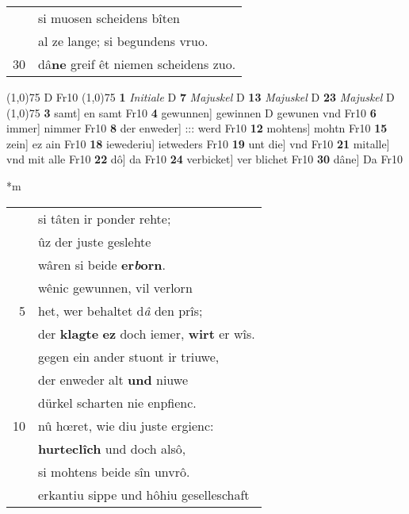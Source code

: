 \documentclass[8pt,a4paper,notitlepage]{article}
\begin{document}
\begin{table}[ht]
\begin{minipage}[t]{0.5\linewidth}
\begin{tabular}{rl}
 & si muosen scheidens bîten\\ 
 & al ze lange; si begundens vruo.\\ 
30 & dâ\textbf{ne} greif êt niemen scheidens zuo.\\ 
\end{tabular}
\scriptsize
\line(1,0){75} \newline
D Fr10 \newline
\line(1,0){75} \newline
\textbf{1} \textit{Initiale} D  \textbf{7} \textit{Majuskel} D  \textbf{13} \textit{Majuskel} D  \textbf{23} \textit{Majuskel} D  \newline
\line(1,0){75} \newline
\textbf{3} samt] en samt Fr10 \textbf{4} gewunnen] gewinnen D gewunen vnd Fr10 \textbf{6} immer] nimmer Fr10 \textbf{8} der enweder] ::: werd Fr10 \textbf{12} mohtens] mohtn Fr10 \textbf{15} zein] ez ain Fr10 \textbf{18} iewederiu] ietweders Fr10 \textbf{19} unt die] vnd Fr10 \textbf{21} mitalle] vnd mit alle Fr10 \textbf{22} dô] da Fr10 \textbf{24} verbicket] ver blichet Fr10 \textbf{30} dâne] Da Fr10 \newline
\end{minipage}
\hspace{0.5cm}
\begin{minipage}[t]{0.5\linewidth}
\small
\begin{center}*m
\end{center}
\begin{tabular}{rl}
 & si tâten ir ponder rehte;\\ 
 & ûz der juste geslehte\\ 
 & wâren si beide \textbf{er\textit{b}orn}.\\ 
 & wênic gewunnen, vil verlorn\\ 
5 & het, wer behaltet d\textit{â} den prîs;\\ 
 & der \textbf{klagte} \textbf{ez} doch iemer, \textbf{wirt} er wîs.\\ 
 & gegen ein ander stuont ir triuwe,\\ 
 & der enweder alt \textbf{und} niuwe\\ 
 & dürkel scharten nie enpfienc.\\ 
10 & nû hœret, wie diu juste ergienc:\\ 
 & \textbf{hurteclîch} und doch alsô,\\ 
 & si mohtens beide sîn unvrô.\\ 
 & erkantiu sippe und hôhiu geselleschaft\\ 

\end{tabular}
\end{minipage}
\end{table}
\end{document}

